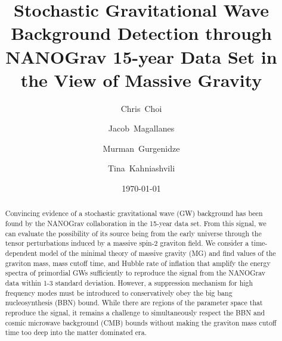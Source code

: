 \documentclass[prd,twocolumn,aps,psfig,nofootinbib,nobibnotes,superscriptaddress,preprintnumbers,times]{revtex4-2}
\begin{document}
\title{Stochastic Gravitational Wave Background Detection through NANOGrav 15-year Data Set in the View of Massive Gravity}

\date{\today}
\author{Chris~Choi}

\author{Jacob~Magallanes}

\author{Murman~Gurgenidze}

\author{Tina~Kahniashvili}

\begin{abstract}
Convincing evidence of a stochastic gravitational wave (GW) background has been found by the NANOGrav collaboration in the 15-year data set. From this signal, we can evaluate the possibility of its source being from the early universe through the tensor perturbations induced by a massive spin-2 graviton field. We consider a time-dependent model of the minimal theory of massive gravity (MG) and find values of the graviton mass, mass cutoff time, and Hubble rate of inflation that amplify the energy spectra of primordial GWs sufficiently to reproduce the signal from the NANOGrav data within 1-3 standard deviation. However, a suppression mechanism for high frequency modes must be introduced to conservatively obey the big bang nucleosynthesis (BBN) bound. While there are regions of the parameter space that reproduce the signal, it remains a challenge to simultaneously respect the BBN and cosmic microwave background (CMB) bounds without making the graviton mass cutoff time too deep into the matter dominated era.
\end{abstract}

\maketitle
\end{document}
